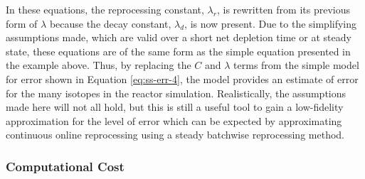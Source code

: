 In these equations, the reprocessing constant, $\lambda_r$, is rewritten from its previous form of $\lambda$ because the decay constant, $\lambda_d$, is now present.
Due to the simplifying assumptions made, which are valid over a short net depletion time or at steady state, these equations are of the same form as the simple equation presented in the example above.
Thus, by replacing the $C$ and $\lambda$ terms from the simple model for error shown in Equation \eqref{eq:ss-err-4}, the model provides an estimate of error for the many isotopes in the reactor simulation.
Realistically, the assumptions made here will not all hold, but this is still a useful tool to gain a low-fidelity approximation for the level of error which can be expected by approximating continuous online reprocessing using a steady batchwise reprocessing method.






\subsubsection{Computational Cost}

